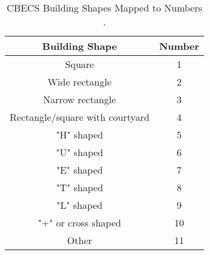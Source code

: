 \begin{table}
\caption[CBECS Building Shapes Mapped to Numbers]{CBECS Building Shapes Mapped to Numbers \citep{comm_modeling_2008}.}
\centering
\label{tab:building_shapes}
\begin{tabular}{|c|c|}
\hline
\textbf{Building Shape}         & \textbf{Number} \\ \hline
Square                          & 1               \\ \hline
Wide rectangle                  & 2               \\ \hline
Narrow rectangle                & 3               \\ \hline
Rectangle/square with courtyard & 4               \\ \hline
"H" shaped                      & 5               \\ \hline
"U" shaped                      & 6               \\ \hline
"E" shaped                      & 7               \\ \hline
"T" shaped                      & 8               \\ \hline
"L" shaped                      & 9               \\ \hline
"+" or cross shaped             & 10              \\ \hline
Other                           & 11              \\ \hline
\end{tabular}
\end{table}